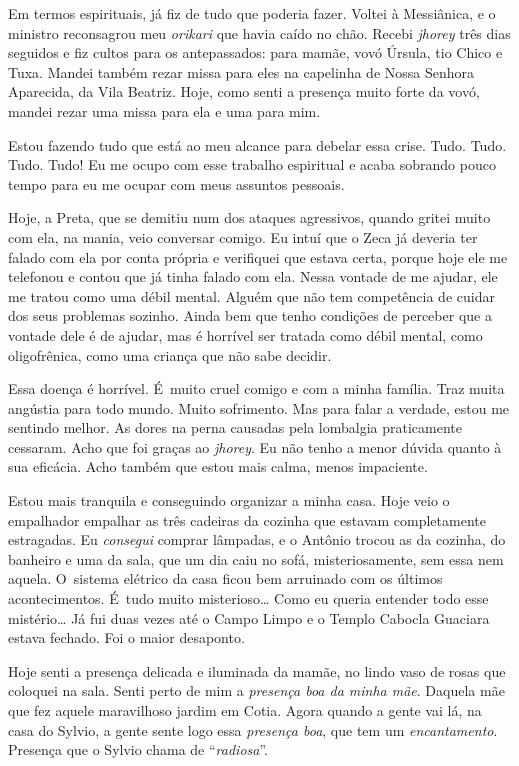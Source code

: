 Em termos espirituais, já fiz de tudo que poderia fazer. Voltei à
Messiânica, e o ministro reconsagrou meu \emph{orikari} que havia caído
no chão. Recebi \emph{jhorey} três dias seguidos e fiz cultos para os
antepassados: para mamãe, vovó Úrsula, tio Chico e Tuxa. Mandei também
rezar missa para eles na capelinha de Nossa Senhora Aparecida, da Vila
Beatriz. Hoje, como senti a presença muito forte da vovó, mandei rezar
uma missa para ela e uma para mim.

Estou fazendo tudo que está ao meu alcance para debelar essa crise.
Tudo. Tudo. Tudo. Tudo! Eu me ocupo com esse trabalho espiritual e acaba
sobrando pouco tempo para eu me ocupar com meus assuntos pessoais.

Hoje, a Preta, que se demitiu num dos ataques agressivos, quando gritei
muito com ela, na mania, veio conversar comigo. Eu intuí que o Zeca já
deveria ter falado com ela por conta própria e verifiquei que estava
certa, porque hoje ele me telefonou e contou que já tinha falado com
ela. Nessa vontade de me ajudar, ele me tratou como uma débil mental.
Alguém que não tem competência de cuidar dos seus problemas sozinho.
Ainda bem que tenho condições de perceber que a vontade dele é de
ajudar, mas é horrível ser tratada como débil mental, como oligofrênica,
como uma criança que não sabe decidir.

Essa doença é horrível. É~muito cruel comigo e com a minha família. Traz
muita angústia para todo mundo. Muito sofrimento. Mas para falar a
verdade, estou me sentindo melhor. As dores na perna causadas pela
lombalgia praticamente cessaram. Acho que foi graças ao \emph{jhorey}.
Eu não tenho a menor dúvida quanto à sua eficácia. Acho também que estou
mais calma, menos impaciente.

Estou mais tranquila e conseguindo organizar a minha casa. Hoje veio o
empalhador empalhar as três cadeiras da cozinha que estavam
completamente estragadas. Eu \emph{consegui} comprar lâmpadas, e o
Antônio trocou as da cozinha, do banheiro e uma da sala, que um dia caiu
no sofá, misteriosamente, sem essa nem aquela. O~sistema elétrico da
casa ficou bem arruinado com os últimos acontecimentos. É~tudo muito
misterioso… Como eu queria entender todo esse mistério… Já
fui duas vezes até o Campo Limpo e o Templo Cabocla Guaciara estava
fechado. Foi o maior desaponto.

Hoje senti a presença delicada e iluminada da mamãe, no lindo vaso de
rosas que coloquei na sala. Senti perto de mim a \emph{presença boa da
minha mãe}. Daquela mãe que fez aquele maravilhoso jardim em Cotia.
Agora quando a gente vai lá, na casa do Sylvio, a gente sente logo essa
\emph{presença boa}, que tem um \emph{encantamento}. Presença que o
Sylvio chama de ``\emph{radiosa}''.


